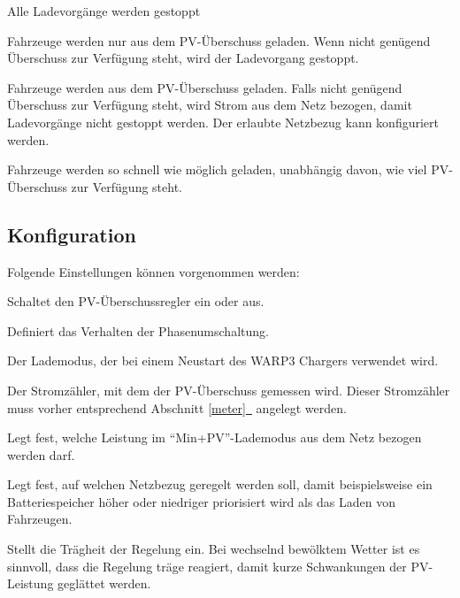 \documentclass[a4paper,10pt]{article}
\newcommand*{\fullref}[1]{Abschnitt \hyperref[{#1}]{\ref*{#1}~\nameref*{#1}}}
\begin{document}
\begin{multicols*}{2}
	\begin{description}[labelindent=0.5cm, leftmargin=0.5cm]
	 \item[Aus] Alle Ladevorgänge werden gestoppt
	 \item[PV] Fahrzeuge werden nur aus dem PV-Überschuss geladen.
               Wenn nicht genügend Überschuss zur Verfügung steht, wird der Ladevorgang gestoppt.
	 \item[Min+PV] Fahrzeuge werden aus dem PV-Überschuss geladen.
                   Falls nicht genügend Überschuss zur Verfügung steht, wird Strom aus dem Netz bezogen,
                   damit Ladevorgänge nicht gestoppt werden.
                   Der erlaubte Netzbezug kann konfiguriert werden.
     \item[Schnell] Fahrzeuge werden so schnell wie möglich geladen, unabhängig davon, wie viel PV-Überschuss zur Verfügung steht.
	\end{description}


	\subsection{Konfiguration}
	Folgende Einstellungen können vorgenommen werden:
	\begin{description}[labelindent=0.5cm, leftmargin=0.5cm]
		\item[Überschussladen aktiviert] Schaltet den PV-Über\-schuss\-regler ein oder aus.
		\item[Umschaltungsmodus] Definiert das Verhalten der Phasenumschaltung.
		\item[Standardlademodus] Der Lademodus, der bei einem Neustart des WARP3 Chargers verwendet wird.
		\item[Stromzähler] Der Stromzähler, mit dem der PV-Überschuss gemessen wird. Dieser Stromzähler muss vorher entsprechend \fullref{meter} angelegt werden.
		\item[Min+PV: Mindestladeleistung] Legt fest, welche Leistung im \enquote{Min+PV}-Lademodus aus dem Netz bezogen werden darf.
		\item[Regelverhalten] Legt fest, auf welchen
		Netzbezug geregelt werden soll, damit beispielsweise ein Batteriespeicher höher oder niedriger priorisiert wird als das Laden von Fahrzeugen.
		\item[Wolkenfilter] Stellt die Trägheit der Regelung
		ein. Bei wechselnd bewölktem Wetter ist es sinnvoll, dass die Regelung
		träge reagiert, damit kurze Schwankungen der PV-Leistung geglättet werden.
	\end{description}


\end{multicols*}
\end{document}
